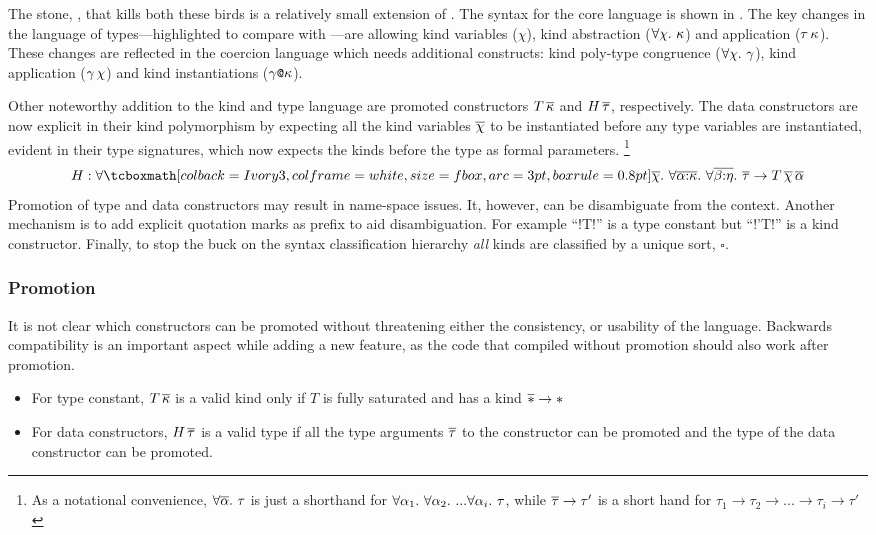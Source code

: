 \documentclass[manuscript,screen,nonacm]{acmart}
\begin{document}
The stone, \SFP, that kills both these birds is a relatively small extension of \SF. The syntax for the core language is shown in . The key changes in the language of types---highlighted to compare with \SFC---are allowing kind variables ($\chi$), kind abstraction ($\forall\chi.~\kappa$) and application ($\tau\, \kappa$). These changes are reflected in the coercion language which needs additional constructs: kind poly-type congruence ($\forall\chi.~\gamma$), kind application ($\gamma\,\chi$) and kind instantiations ($\gamma\texttt{@}\kappa$).

Other noteworthy addition to the kind and type language are promoted constructors $T\,\overline{\kappa}$ and $H\,\overline{\tau}$, respectively. The data constructors are now explicit in their kind polymorphism by expecting all the kind variables $\overline{\chi}$ to be instantiated before any type variables are instantiated, evident in their type signatures, which now expects the kinds before the type as formal parameters.
\footnote{As a notational convenience, $\forall\overline{\alpha}.~\tau$ is just a shorthand for $\forall\alpha_1.~\forall\alpha_2.~... \forall\alpha_i.~\tau$, while $\overline{\tau} \to \tau'$ is a short hand for $\tau_1 \to \tau_2 \to ... \to \tau_i \to \tau'$
}{$$ H : \Forall {\shl{\many\chi}} {\Forall {\many{\TyVar\co\kappa}} {\Forall {\many{\beta\co\eta}} {\many\tau \to T \App\many{\chi}\App\many{\TyVar}}}} $$
}
Promotion of type and data constructors may result in name-space issues. It, however, can be disambiguate from the context. Another mechanism is to add explicit quotation marks as prefix to aid disambiguation.
For example ``!T!'' is a type constant but ``!'T!'' is a kind constructor.
Finally, to stop the buck on the syntax classification hierarchy \emph{all} kinds are classified by a unique sort, $\square$.

\subsubsection{Promotion}
It is not clear which constructors can be promoted without threatening either the consistency, or usability of the language. Backwards compatibility is an important aspect while adding a new feature, as the code that compiled without promotion should also work after promotion.

\begin{itemize}
\item For type constant, $T\,\overline{\kappa}$ is a valid kind only if $T$ is fully saturated and has a kind $\overline{\ast} \to \ast$
\item For data constructors, $H\,\overline{\tau}$ is a valid type if all the type arguments $\overline{\tau}$ to the constructor can be promoted and the type of the data constructor can be promoted.
\end{itemize}
\end{document}
